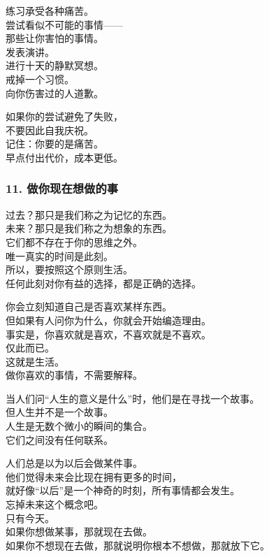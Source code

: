 \documentclass[
]{article}
\begin{document}
练习承受各种痛苦。\\
尝试看似不可能的事情------\\
那些让你害怕的事情。\\
发表演讲。\\
进行十天的静默冥想。\\
戒掉一个习惯。\\
向你伤害过的人道歉。

如果你的尝试避免了失败，\\
不要因此自我庆祝。\\
记住：你要的是痛苦。\\
早点付出代价，成本更低。

\subsubsection{11.
做你现在想做的事}\label{11-ux505aux4f60ux73b0ux5728ux60f3ux505aux7684ux4e8b}

过去？那只是我们称之为记忆的东西。\\
未来？那只是我们称之为想象的东西。\\
它们都不存在于你的思维之外。\\
唯一真实的时间是此刻。\\
所以，要按照这个原则生活。\\
任何此刻对你有益的选择，都是正确的选择。

你会立刻知道自己是否喜欢某样东西。\\
但如果有人问你为什么，你就会开始编造理由。\\
事实是，你喜欢就是喜欢，不喜欢就是不喜欢。\\
仅此而已。\\
这就是生活。\\
做你喜欢的事情，不需要解释。

当人们问``人生的意义是什么''时，他们是在寻找一个故事。\\
但人生并不是一个故事。\\
人生是无数个微小的瞬间的集合。\\
它们之间没有任何联系。

人们总是以为以后会做某件事。\\
他们觉得未来会比现在拥有更多的时间，\\
就好像``以后''是一个神奇的时刻，所有事情都会发生。\\
忘掉未来这个概念吧。\\
只有今天。\\
如果你想做某事，那就现在去做。\\
如果你不想现在去做，那就说明你根本不想做，那就放下它。
\end{document}

